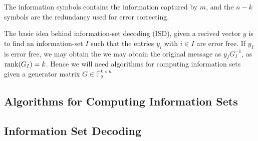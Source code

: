The information symbols contains the information captured by $m$, and the $n-k$ symbols are the redundancy used for error correcting.

The basic idea behind information-set decoding (ISD), given a recived vector $y$ is to find an information-set $I$ such that the entries $y_i$ with $i \in I$ are error free. If $y_I$ is error free, we may obtain the we may obtain the original message as $y_IG^{-1}_I$, as $\textnormal{rank}(G_I) = k$. Hence we will need algorithms for computing information sets given a generator matrix $G \in \mathbb{F}_q^{k \times n}$
\subsection{Algorithms for Computing Information Sets}

\subsection{Information Set Decoding}



